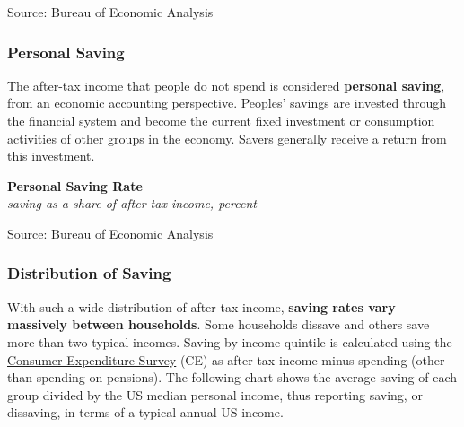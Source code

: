 \documentclass{report}
\makeatletter
\newcommand{\tbllink}[1]{\href{https://raw.githubusercontent.com/bdecon/US-chartbook/master/chartbook/data/#1}{\faTable}}
\newcommand*\short[1]{\expandafter\@gobbletwo\number\numexpr#1\relax}
\newcommand{\dateaxisticks}{
		date coordinates in=x, axis line style={draw=none},
		xmax={2022-10-31},
		max space between ticks=40,	    
		xtick={{1990-01-01}, {1992-01-01}, {1994-01-01}, 
			{1996-01-01}, {1998-01-01}, {2000-01-01}, 
			{2002-01-01}, {2004-01-01}, {2006-01-01},
			{2008-01-01}, {2010-01-01}, {2012-01-01}, {2014-01-01},
		    {2016-01-01}, {2018-01-01}, {2020-01-01}, {2022-01-01}, 
		    {2024-01-01}, {2026-01-01}},
		minor xtick={{1989-01-01}, {1991-01-01}, {1993-01-01},
			{1995-01-01}, {1997-01-01}, {1999-01-01}, 
			{2001-01-01}, {2003-01-01}, {2005-01-01}, {2007-01-01},
		    {2009-01-01}, {2011-01-01}, {2013-01-01}, {2015-01-01},
		    {2017-01-01}, {2019-01-01}, {2021-01-01}, {2023-01-01}, 
		    {2025-01-01}, {2027-01-01}},
		enlarge y limits={0.06}, enlarge x limits={0.01},
		}
\newcommand{\bbar}[2]{extra #1 ticks = {{#2}}, extra #1 tick labels = ,
		extra #1 tick style = {grid=major, grid style={thick, black!25}},}
\newcommand{\stdline}[4]{\addplot[very thick, no markers, color=#1] 
		table [x=#2, y=#3, col sep=comma] {#4};	}
\newcommand{\rbars}{
		\fill[color=black!10] (axis cs:{1990-07-01},\pgfkeysvalueof{/pgfplots/ymin}) rectangle 
			(axis cs:{1991-03-01}, \pgfkeysvalueof{/pgfplots/ymax});
		\fill[color=black!10] (axis cs:{2007-12-01},\pgfkeysvalueof{/pgfplots/ymin}) rectangle 
			(axis cs:{2009-07-01}, \pgfkeysvalueof{/pgfplots/ymax});
		\fill[color=black!10] (axis cs:{2001-03-01},\pgfkeysvalueof{/pgfplots/ymin}) rectangle 
			(axis cs:{2001-11-01}, \pgfkeysvalueof{/pgfplots/ymax});
		\fill[color=black!10] (axis cs:{2020-02-01},\pgfkeysvalueof{/pgfplots/ymin}) rectangle 
			(axis cs:{2020-05-01}, \pgfkeysvalueof{/pgfplots/ymax});}
\makeatother
\begin{document}
{\begin{minipage}{0.76\textwidth}
\footnotesize{Source: Bureau of Economic Analysis} \hfill \tbllink{pcedecomp.csv}
\end{minipage}
\newpage
\begin{minipage}{0.76\textwidth}
\subsubsection*{Personal Saving}
\small The after-tax income that people do not spend is \href{https://www.bea.gov/index.php/help/glossary/personal-saving}{considered} \textbf{personal saving}, from an economic accounting perspective. Peoples' savings are invested through the financial system and become the current fixed investment or consumption activities of other groups in the economy. Savers generally receive a return from this investment.


\vspace{1mm}

\normalsize \textbf{Personal Saving Rate}\\
\footnotesize{\textit{saving as a share of after-tax income, percent}}
\vspace{3.4cm}

\hspace{4mm} 

\footnotesize{Source: Bureau of Economic Analysis} \hfill \tbllink{psavert.csv}
\vspace{1mm}

\subsubsection*{Distribution of Saving}
\small With such a wide distribution of after-tax income, \textbf{saving rates vary massively between households}. Some households dissave and others save more than two typical incomes. Saving by income quintile is calculated using the \href{https://www.bls.gov/cex/}{Consumer Expenditure Survey} (CE) as after-tax income minus spending (other than spending on pensions). The following chart shows the average saving of each group divided by the US median personal income, thus reporting saving, or dissaving, in terms of a typical annual US income. 
\vspace{1mm}


\end{minipage}}
\end{document}
